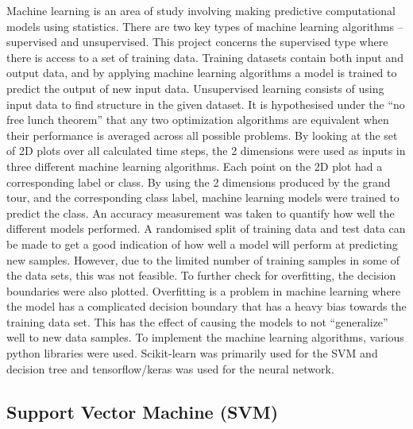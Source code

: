 \documentclass[a4paper,11pt,twoside]{article}
\begin{document}
Machine learning is an area of study involving making predictive computational models using statistics. There are two key types of machine learning algorithms – supervised and unsupervised. This project concerns the supervised type where there is access to a set of training data. Training datasets contain both input and output data, and by applying machine learning algorithms a model is trained to predict the output of new input data. Unsupervised learning consists of using input data to find structure in the given dataset.
\newline
\newline
It is hypothesised under the “no free lunch theorem” that any two optimization algorithms are equivalent when their performance is averaged across all possible problems. By looking at the set of 2D plots over all calculated time steps, the 2 dimensions were used as inputs in three different machine learning algorithms. Each point on the 2D plot had a corresponding label or class. By using the 2 dimensions produced by the grand tour, and the corresponding class label, machine learning models were trained to predict the class. An accuracy measurement was taken to quantify how well the different models performed. A randomised split of training data and test data can be made to get a good indication of how well a model will perform at predicting new samples. However, due to the limited number of training samples in some of the data sets, this was not feasible. To further check for overfitting, the decision boundaries were also plotted.
\newline
\newline
Overfitting is a problem in machine learning where the model has a complicated decision boundary that has a heavy bias towards the training data set. This has the effect of causing the models to not “generalize” well to new data samples.
\newline
\newline
To implement the machine learning algorithms, various python libraries were used. Scikit-learn was primarily used for the SVM and decision tree and tensorflow/keras was used for the neural network.

\subsection{Support Vector Machine (SVM)}
\end{document}
